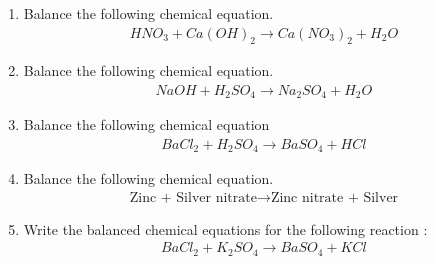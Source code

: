 \renewcommand{\theequation}{\theenumi}
\begin{enumerate}[label=\arabic*.,ref=\thesubsection.\theenumi]
\item     Balance the following chemical equation.
    \begin{align}
        \label{eq:solutions/chem/6ato balance} HNO_{3}+ Ca(OH)_{2}\to Ca(NO_{3})_{2}+H_{2}O
    \end{align}

\solution


\item Balance the following chemical equation.
\begin{align}
NaOH + H_2SO_4 \xrightarrow{} Na_2SO_4  +  H_2O
\end{align}
\solution

\item Balance the following chemical equation
\begin{align}\label{1}
    BaCl_2 + H_2SO_4 \xrightarrow{} BaSO_4 + HCl
\end{align}

\solution

%
\item    Balance the following chemical equation.
    \begin{align}
        \label{eq:solutions/chem/7b1} \text{Zinc + Silver nitrate} \to \text{Zinc nitrate + Silver}
    \end{align}
\solution


\item Write the balanced chemical equations for the following reaction :
\begin{align}
 BaCl_2 + K_2SO_4 \rightarrow BaSO_4 + KCl \label{eq:solutions/chemistry/7d:1}   
\end{align}
\solution

%

\end{enumerate}
